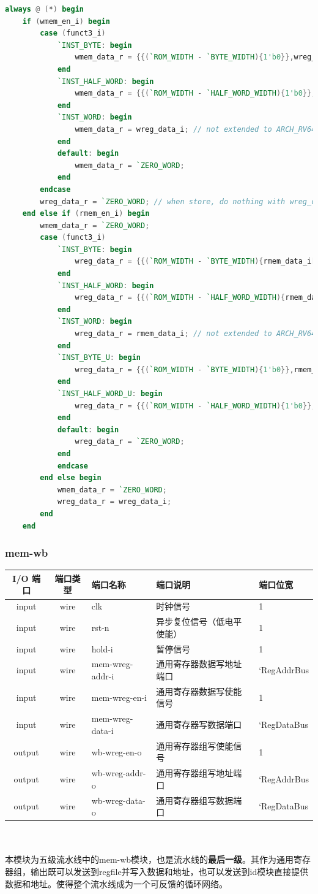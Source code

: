 \documentclass[lang=cn,11pt,a4paper]{elegantpaper}
\begin{document}
\begin{lstlisting}[language=verilog]
always @ (*) begin
	if (wmem_en_i) begin
		case (funct3_i)
			`INST_BYTE: begin
				wmem_data_r = {{(`ROM_WIDTH - `BYTE_WIDTH){1'b0}},wreg_data_i[`BYTE_WIDTH - 1:0]};
			end
			`INST_HALF_WORD: begin
				wmem_data_r = {{(`ROM_WIDTH - `HALF_WORD_WIDTH){1'b0}},wreg_data_i[`HALF_WORD_WIDTH - 1:0]};
			end
			`INST_WORD: begin
				wmem_data_r = wreg_data_i; // not extended to ARCH_RV64, so the code has been simplified
			end
			default: begin
				wmem_data_r = `ZERO_WORD;
			end
		endcase
		wreg_data_r = `ZERO_WORD; // when store, do nothing with wreg_data
	end else if (rmem_en_i) begin
		wmem_data_r = `ZERO_WORD;
		case (funct3_i)
			`INST_BYTE: begin
				wreg_data_r = {{(`ROM_WIDTH - `BYTE_WIDTH){rmem_data_i[`BYTE_WIDTH - 1]}},rmem_data_i[`BYTE_WIDTH - 1:0]};
			end
			`INST_HALF_WORD: begin
				wreg_data_r = {{(`ROM_WIDTH - `HALF_WORD_WIDTH){rmem_data_i[`HALF_WORD_WIDTH - 1]}},rmem_data_i[`HALF_WORD_WIDTH - 1]};
			end
			`INST_WORD: begin
				wreg_data_r = rmem_data_i; // not extended to ARCH_RV64, so the code has been simplified
			end
			`INST_BYTE_U: begin
				wreg_data_r = {{(`ROM_WIDTH - `BYTE_WIDTH){1'b0}},rmem_data_i[`BYTE_WIDTH - 1:0]};
			end
			`INST_HALF_WORD_U: begin
				wreg_data_r = {{(`ROM_WIDTH - `HALF_WORD_WIDTH){1'b0}},rmem_data_i[`HALF_WORD_WIDTH - 1]};
			end
			default: begin
				wreg_data_r = `ZERO_WORD;
			end
			endcase
		end else begin
			wmem_data_r = `ZERO_WORD;
			wreg_data_r = wreg_data_i;
		end
	end
\end{lstlisting}
\subsubsection{mem-wb}
\begin{tabular}{cclll}
	\toprule
	I/O 端口 & 端口类型 &端口名称&端口说明 &端口位宽\\
	\midrule
	input &wire& clk & 时钟信号 & 1 \\
	input &wire& rst-n & 异步复位信号（低电平使能） & 1 \\
	input &wire& hold-i & 暂停信号       & 1   \\
	
	input &wire& mem-wreg-addr-i & 通用寄存器数据写地址端口 & `RegAddrBus \\
	input &wire& mem-wreg-en-i & 通用寄存器数据写使能信号 & 1  \\
	input &wire& mem-wreg-data-i & 通用寄存器写数据端口 & `RegDataBus  \\
	
	output &wire& wb-wreg-en-o & 通用寄存器组写使能信号    & 1   \\
	output &wire& wb-wreg-addr-o & 通用寄存器组写地址端口    & `RegAddrBus  \\
	output &wire& wb-wreg-data-o & 通用寄存器组写数据端口    & `RegDataBus  \\
	\bottomrule
\end{tabular}\\
\\
本模块为五级流水线中的mem-wb模块，也是流水线的\textbf{最后一级}。其作为通用寄存器组，输出既可以发送到regfile并写入数据和地址，也可以发送到id模块直接提供数据和地址。使得整个流水线成为一个可反馈的循环网络。
\end{document}

